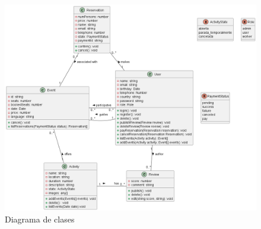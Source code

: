 \begin{figure}[H]
	\centering
	\includegraphics[width=1\textwidth]{5-AnalisisDelSistemaDeInformacion/Clases/diagrama.png}
	\caption{Diagrama de clases}
	\label{fig:mi_imagen}
\end{figure}
